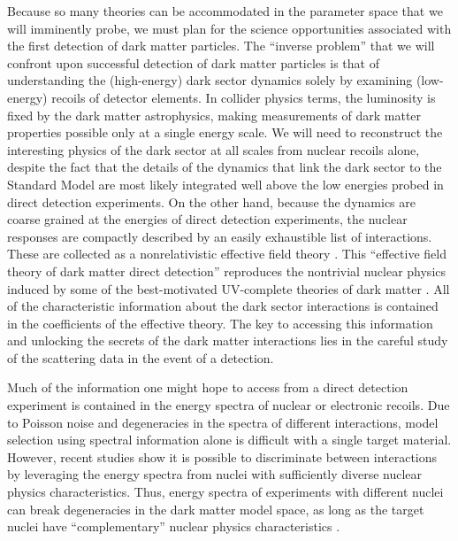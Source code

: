 \documentclass[11pt]{article}
\begin{document}
Because so many theories can be accommodated in the parameter space that we will imminently probe, we must plan for the science opportunities associated with the first detection of dark matter particles. The ``inverse problem'' that we will confront upon successful detection of dark matter particles is that of understanding the (high-energy) dark sector dynamics solely by examining (low-energy) recoils of detector elements. In collider physics terms, the luminosity is fixed by the dark matter astrophysics, making measurements of dark matter properties possible only at a single energy scale. We will need to reconstruct the interesting physics of the dark sector at all scales from nuclear recoils alone, despite the fact that the details of the dynamics that link the dark sector to the Standard Model are most likely integrated well above the low energies probed in direct detection experiments. On the other hand, because the dynamics are coarse grained at the energies of direct detection experiments, the nuclear responses are compactly described by an easily exhaustible list of interactions. These are collected as a nonrelativistic effective field theory \cite{Fitzpatrick:2012ix, Anand:2013yka}. This ``effective field theory of dark matter direct detection'' reproduces the nontrivial nuclear physics induced by some of the best-motivated UV-complete theories of dark matter \cite{Gresham:2014vja, Gluscevic:2015sqa}. %
All of the characteristic information about the dark sector interactions is contained in the coefficients of the effective theory. The key to accessing this information and unlocking the secrets of the dark matter interactions lies in the careful study of the scattering data in the event of a detection.

Much of the information one might hope to access from a direct detection experiment is contained in the energy spectra of nuclear or electronic recoils. Due to Poisson noise and degeneracies in the spectra of different interactions, model selection using spectral information alone is difficult with a single target material. However, recent studies show it is possible to discriminate between interactions by leveraging the energy spectra from nuclei with sufficiently diverse nuclear physics characteristics. Thus, energy spectra of experiments with different nuclei can break degeneracies in the dark matter model space, as long as the target nuclei have ``complementary'' nuclear physics characteristics \cite{McDermott:2011hx,Peter:2013aha,Gluscevic:2014vga,Catena:2014epa,Catena:2014hla,Dent:2015zpa,Gluscevic:2015sqa,Ruppin:2014bra}.
\end{document}
